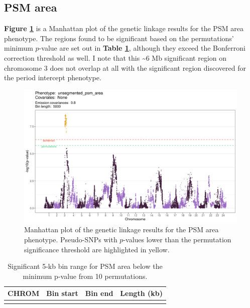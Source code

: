 \documentclass[
]{book}
\begin{document}
\hypertarget{psm-area}{%
\subsection{PSM area}\label{psm-area}}

\textbf{Figure \ref{fig:psm-manhattan}} is a Manhattan plot of the genetic linkage results for the PSM area phenotype. The regions found to be significant based on the permutations' minimum \(p\)-value are set out in \textbf{Table \ref{tab:somite-sig-psm-tbl}}, although they exceed the Bonferroni correction threshold as well. I note that this \textasciitilde6 Mb significant region on chromosome 3 does not overlap at all with the significant region discovered for the period intercept phenotype.



\begin{figure}
\includegraphics[width=1\linewidth]{figs/somites/manhattan_psm_no-covariates} \caption{Manhattan plot of the genetic linkage results for the PSM area phenotype. Pseudo-SNPs with \(p\)-values lower than the permutation significance threshold are highlighted in yellow.}\label{fig:psm-manhattan}
\end{figure}

\begin{table}

\caption{\label{tab:somite-sig-psm-tbl}Significant 5-kb bin range for PSM area below the minimum p-value from 10 permutations.}
\centering
\begin{tabular}[t]{rrrr}
\toprule
CHROM & Bin start & Bin end & Length (kb)\\
\midrule
\cellcolor{gray!6}{3} & \cellcolor{gray!6}{20375001} & \cellcolor{gray!6}{26285000} & \cellcolor{gray!6}{5910}\\
\bottomrule
\end{tabular}
\end{table}
\end{document}
